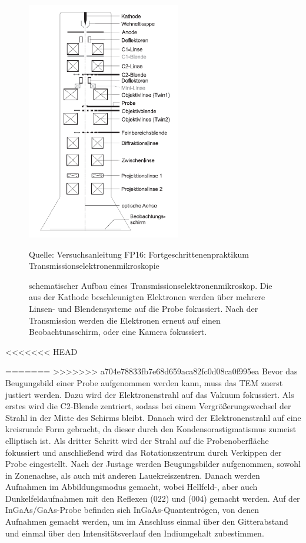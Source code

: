 \documentclass[a4paper,11pt,DIV=11]{scrartcl}
\begin{document}
\begin{figure}[H]
\center
\includegraphics[width=0.6\textwidth]{tem.png}
\caption{schematischer Aufbau eines Transmissionselektronenmikroskop. Die aus der Kathode beschleunigten Elektronen werden über mehrere Linsen- und Blendensysteme auf die Probe fokussiert. Nach der Transmission werden die Elektronen erneut auf einen Beobachtunsschirm, oder eine Kamera fokussiert.}
\begin{footnotesize}
\begin{flushleft}
Quelle: Versuchsanleitung FP16: Fortgeschrittenenpraktikum Transmissionselektronenmikroskopie
\end{flushleft}
\end{footnotesize}
\label{TEM}
\end{figure}
<<<<<<< HEAD

=======
>>>>>>> a704e78833fb7e68d659aca82fc0d08ca0f995ea
Bevor das Beugungsbild einer Probe aufgenommen werden kann, muss das TEM zuerst justiert werden. Dazu wird der Elektronenstrahl auf das Vakuum fokussiert. Als erstes wird die C2-Blende zentriert, sodass bei einem Vergrößerungswechsel der Strahl in der Mitte des Schirms bleibt. Danach wird der Elektronenstrahl auf eine kreisrunde Form gebracht, da dieser durch den Kondensorastigmatismus zumeist elliptisch ist. Als dritter Schritt wird der Strahl auf die Probenoberfläche fokussiert und anschließend wird das Rotationszentrum durch Verkippen der Probe eingestellt. Nach der Justage werden Beugungsbilder aufgenommen, sowohl in Zonenachse, als auch mit anderen Lauekreiszentren. Danach werden Aufnahmen im Abbildungsmodus gemacht, wobei Hellfeld-, aber auch Dunkelfeldaufnahmen mit den Reflexen (022) und (004) gemacht werden. Auf der InGaAs/GaAs-Probe befinden sich InGaAs-Quantentrögen, von denen Aufnahmen gemacht werden, um im Anschluss einmal über den Gitterabstand und einmal über den Intensitätsverlauf den Indiumgehalt zubestimmen.
\end{document}
